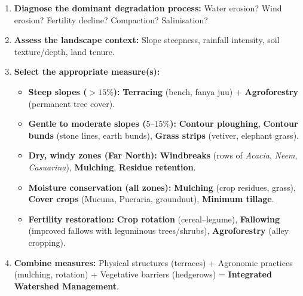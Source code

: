 \documentclass[11pt]{article}
\begin{document}
\begin{methode}
\begin{enumerate}
    \item \textbf{Diagnose the dominant degradation process:} Water erosion? Wind erosion? Fertility decline? Compaction? Salinisation?
    \item \textbf{Assess the landscape context:} Slope steepness, rainfall intensity, soil texture/depth, land tenure.
    \item \textbf{Select the appropriate measure(s):}
    \begin{itemize}
        \item \textbf{Steep slopes ($> 15\%$):} \textbf{Terracing} (bench, fanya juu) + \textbf{Agroforestry} (permanent tree cover).
        \item \textbf{Gentle to moderate slopes ($5–15\%$):} \textbf{Contour ploughing}, \textbf{Contour bunds} (stone lines, earth bunds), \textbf{Grass strips} (vetiver, elephant grass).
        \item \textbf{Dry, windy zones (Far North):} \textbf{Windbreaks} (rows of \emph{Acacia}, \emph{Neem}, \emph{Casuarina}), \textbf{Mulching}, \textbf{Residue retention}.
        \item \textbf{Moisture conservation (all zones):} \textbf{Mulching} (crop residues, grass), \textbf{Cover crops} (Mucuna, Pueraria, groundnut), \textbf{Minimum tillage}.
        \item \textbf{Fertility restoration:} \textbf{Crop rotation} (cereal–legume), \textbf{Fallowing} (improved fallows with leguminous trees/shrubs), \textbf{Agroforestry} (alley cropping).
    \end{itemize}
    \item \textbf{Combine measures:} Physical structures (terraces) + Agronomic practices (mulching, rotation) + Vegetative barriers (hedgerows) = \textbf{Integrated Watershed Management}.
\end{enumerate}
\end{methode}
\end{document}
